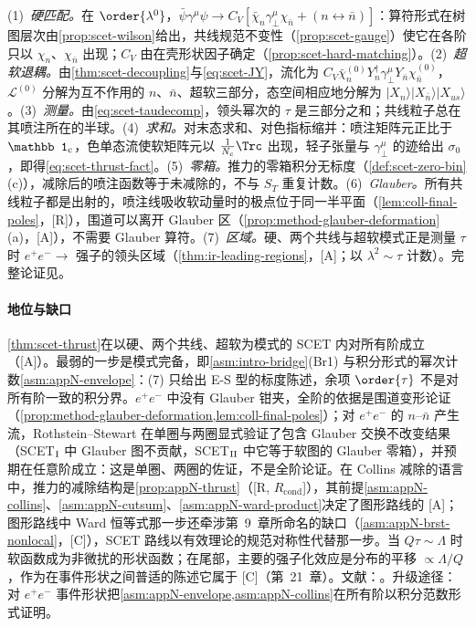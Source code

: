 \begin{proofsketch}
(1)~\emph{硬匹配。}在 $\order{\lambda^0}$，$\bar\psi\gamma^\mu\psi\to C_V[\bar\chi_n\gamma_\perp^\mu\chi_{\bar n}+(n\leftrightarrow\bar n)]$：算符形式在树图层次由\cref{prop:scet-wilson}给出，共线规范不变性（\cref{prop:scet-gauge}）使它在各阶只以 $\chi_n$、$\chi_{\bar n}$ 出现；$C_V$ 由在壳形状因子确定（\cref{prop:scet-hard-matching}）。(2)~\emph{超软退耦。}由\cref{thm:scet-decoupling}与\cref{eq:scet-JY}，流化为 $C_V\bar\chi^{(0)}_nY_n^\dagger\gamma_\perp^\mu Y_{\bar n}\chi^{(0)}_{\bar n}$，$\mathcal L^{(0)}$ 分解为互不作用的 $n$、$\bar n$、超软三部分，态空间相应地分解为 $|X_n\rangle|X_{\bar n}\rangle|X_{us}\rangle$。(3)~\emph{测量。}由\cref{eq:scet-taudecomp}，领头幂次的 $\tau$ 是三部分之和；共线粒子总在其喷注所在的半球。(4)~\emph{求和。}对末态求和、对色指标缩并：喷注矩阵元正比于 $\mathbb 1_{\rm c}$，色单态流使软矩阵元以 $\frac1{N_c}\Trc$ 出现，轻子张量与 $\gamma_\perp^\mu$ 的迹给出 $\sigma_0$，即得\cref{eq:scet-thrust-fact}。(5)~\emph{零箱。}推力的零箱积分无标度（\cref{def:scet-zero-bin}(c)），减除后的喷注函数等于未减除的，不与 $S_T$ 重复计数。(6)~\emph{Glauber。}所有共线粒子都是出射的，喷注线吸收软动量时的极点位于同一半平面（\cref{lem:coll-final-poles}，[R]），围道可以离开 Glauber 区（\cref{prop:method-glauber-deformation}(a)，[A]），不需要 Glauber 算符。(7)~\emph{区域。}硬、两个共线与超软模式正是测量 $\tau$ 时 $e^+e^-\to$ 强子的领头区域（\cref{thm:ir-leading-regions}，[A]；以 $\lambda^2\sim\tau$ 计数）。完整论证见\cite{Bauer:2003di,Fleming:2007qr,Schwartz:2007ib,Fleming:2007xt,BecherSchwartz2008,Bauer:2008dt}。
\end{proofsketch}

\paragraph{地位与缺口}
\cref{thm:scet-thrust}在以硬、两个共线、超软为模式的 SCET 内对所有阶成立（[A]）。最弱的一步是模式完备，即\cref{asm:intro-bridge}(Br1) 与积分形式的幂次计数\cref{asm:appN-envelope}：(7) 只给出 E-S 型的标度陈述，余项 $\order{\tau}$ 不是对所有阶一致的积分界。$e^+e^-$ 中没有 Glauber 钳夹，全阶的依据是围道变形论证（\cref{prop:method-glauber-deformation,lem:coll-final-poles}）；对 $e^+e^-$ 的 $n$–$\bar n$ 产生流，Rothstein--Stewart 在单圈与两圈显式验证了包含 Glauber 交换不改变结果（SCET$_{\rm I}$ 中 Glauber 图不贡献，SCET$_{\rm II}$ 中它等于软图的 Glauber 零箱），并预期在任意阶成立\cite[第~10.1、10.3~节]{RothsteinStewart2016}：这是单圈、两圈的佐证，不是全阶论证。在 Collins 减除的语言中，推力的减除结构是\cref{prop:appN-thrust}（[R, $R_{\mathrm{cond}}$]），其前提\cref{asm:appN-collins}、\cref{asm:appN-cutsum}、\cref{asm:appN-ward-product}决定了图形路线的 [A]；图形路线中 Ward 恒等式那一步还牵涉第~9~章所命名的缺口（\cref{asm:appN-brst-nonlocal}，[C]），SCET 路线以有效理论的规范对称性代替那一步。当 $Q\tau\sim\Lambda$ 时软函数成为非微扰的形状函数\cite{Korchemsky:1994is,Korchemsky:1999kt,Bauer:2003di}；在尾部，主要的强子化效应是分布的平移 $\propto\Lambda/Q$，作为在事件形状之间普适的陈述它属于 [C]（第~21~章）。文献：\cite{Bauer:2003di,Lee:2006nr,Fleming:2007qr,Schwartz:2007ib,Fleming:2007xt,BecherSchwartz2008,Bauer:2008dt}。升级途径：对 $e^+e^-$ 事件形状把\cref{asm:appN-envelope,asm:appN-collins}在所有阶以积分范数形式证明。

